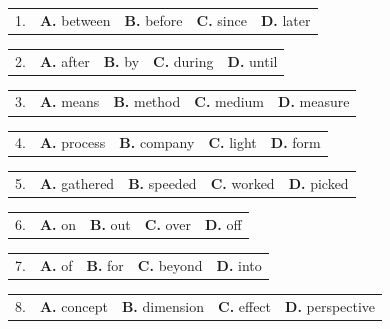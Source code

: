 \documentclass[UTF8,11pt]{ctexart}
\begin{document}
\noindent\begin{tabularx}{\linewidth}{@{}lXXXX@{}}1. & \textbf{A.} between & \textbf{B.} before & \textbf{C.} since & \textbf{D.} later\\\end{tabularx}\par

\noindent\begin{tabularx}{\linewidth}{@{}lXXXX@{}}2. & \textbf{A.} after & \textbf{B.} by & \textbf{C.} during & \textbf{D.} until\\\end{tabularx}\par

\noindent\begin{tabularx}{\linewidth}{@{}lXXXX@{}}3. & \textbf{A.} means & \textbf{B.} method & \textbf{C.} medium & \textbf{D.} measure\\\end{tabularx}\par

\noindent\begin{tabularx}{\linewidth}{@{}lXXXX@{}}4. & \textbf{A.} process & \textbf{B.} company & \textbf{C.} light & \textbf{D.} form\\\end{tabularx}\par

\noindent\begin{tabularx}{\linewidth}{@{}lXXXX@{}}5. & \textbf{A.} gathered & \textbf{B.} speeded & \textbf{C.} worked & \textbf{D.} picked\\\end{tabularx}\par

\noindent\begin{tabularx}{\linewidth}{@{}lXXXX@{}}6. & \textbf{A.} on & \textbf{B.} out & \textbf{C.} over & \textbf{D.} off\\\end{tabularx}\par

\noindent\begin{tabularx}{\linewidth}{@{}lXXXX@{}}7. & \textbf{A.} of & \textbf{B.} for & \textbf{C.} beyond & \textbf{D.} into\\\end{tabularx}\par

\noindent\begin{tabularx}{\linewidth}{@{}lXXXX@{}}8. & \textbf{A.} concept & \textbf{B.} dimension & \textbf{C.} effect & \textbf{D.} perspective\\\end{tabularx}\par
\end{document}
